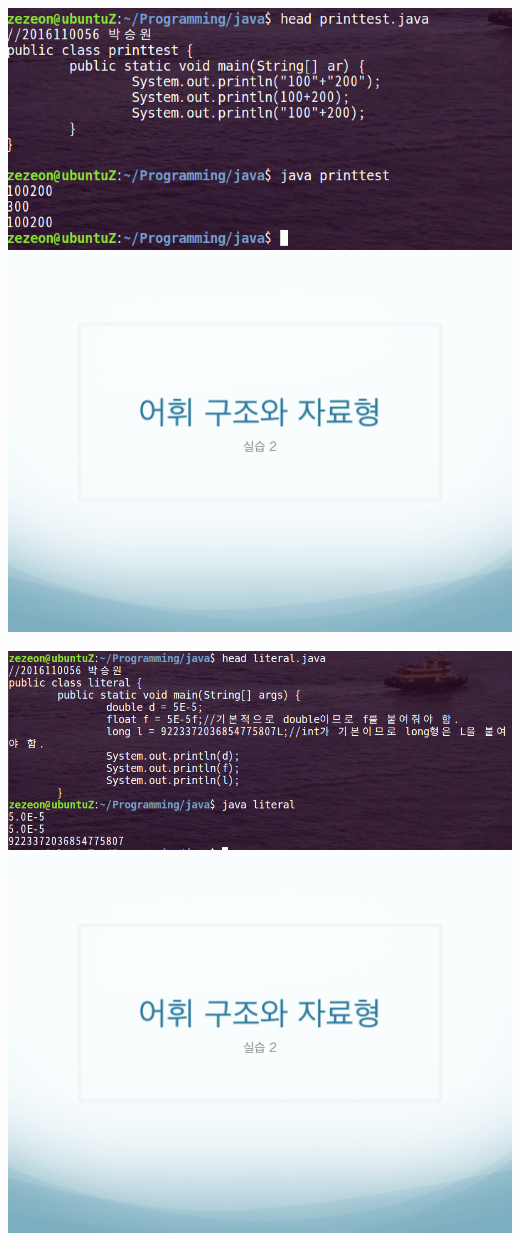 \documentclass[12pt,a4paper]{article}
\begin{document}

\includegraphics[width=\textwidth]{printtest.png}	
\includegraphics[page=9, width=\textwidth]{2.pdf}

\includegraphics[width=\textwidth]{literal.png}	
\includegraphics[page=12, width=\textwidth]{2.pdf}
\end{document}
